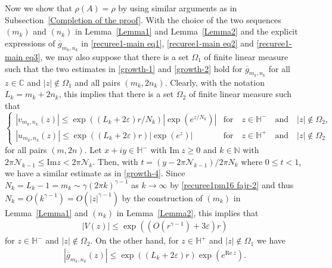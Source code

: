 \documentclass[12pt]{amsart}
\numberwithin{equation}{section}
\begin{document}
Now we show that $\rho(A)=\rho$ by using similar arguments as in Subsection~\ref{Completion of the proof}. With the choice of the two sequences $(m_k)$ and $(n_k)$ in Lemma~\ref{Lemma1} and Lemma~\ref{Lemma2} and the explicit expressions of $\overline{g}_{m_k,n_k}$ in \eqref{recuree1-main eq1}, \eqref{recuree1-main eq2} and \eqref{recuree1-main eq3}, we may also suppose that there is a set $\Omega_1$ of finite linear measure such that the two estimates in \eqref{growth-1} and \eqref{growth-2} hold for $\overline{g}_{m_k,n_k}$ for all $z\in \mathbb{C}$ and $|z|\not\in \Omega_1$ and all pairs $(m_k,2n_k)$. Clearly, with the notation $L_k=m_k+2n_k$, this implies that there is a set $\Omega_2$ of finite linear measure such that
\begin{equation*}%
\left\{
\begin{array}{ll}
|v_{m_k,n_k}(z)|\leq \exp((L_k+2\varepsilon)r/N_k)\left|\exp(e^{z/N_k})\right| & \text{for} \quad z\in \mathbb{H}^{-} \quad \text{and} \quad |z|\not\in \Omega_2,\\
|u_{m_k,n_k}(z)|\leq \exp((L_k+2\varepsilon)r)\left|\exp(e^{z})\right|     & \text{for} \quad z\in \mathbb{H}^{+} \quad \text{and} \quad |z|\not\in \Omega_2
\end{array}
\right.
\end{equation*}
for all pairs $(m,2n)$. Let $x+iy\in \mathbb{H}^{-}$ with $\text{Im}\ z\geq 0$ and $k\in \mathbb{N}$ with $2\pi \mathcal{N}_{k-1}\leq \text{Im} z<2\pi \mathcal{N}_k$. Then, with $t=(y-2\pi \mathcal{N}_{k-1})/{2\pi N_k}$ where $0\leq t<1$, we have a similar estimate as in \eqref{growth-4}. Since $N_k=L_k-1=m_k\sim\gamma(2\pi k)^{\gamma-1}$ as $k\to\infty$ by \eqref{recuree1pm16  fajr-2} and thus $N_k=O(k^{\gamma-1})=O(|z|^{\gamma-1})$ by the construction of $(m_k)$ in Lemma~\ref{Lemma1} and $(n_k)$ in Lemma~\ref{Lemma2}, this implies that
\begin{equation}\label{recuree1pm125}
\begin{split}
|V(z)|\leq \exp((O(r^{\gamma-1})+3\varepsilon)r)
\end{split}
\end{equation}
for $z\in \mathbb{H}^{-}$ and $|z|\not\in \Omega_2$. On the other hand, for $z\in \mathbb{H}^{+}$ and $|z|\not\in \Omega_1$ we have
\begin{equation*}%
\begin{split}
|\overline{g}_{m_k,n_k}(z)|\leq \exp((L_k+2\varepsilon)r)\exp\left(e^{\text{Re}\ z}\right).
\end{split}
\end{equation*}
\end{document}
